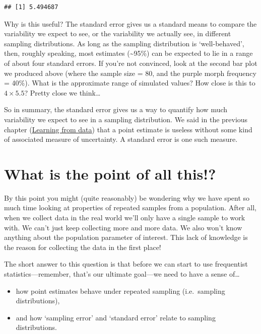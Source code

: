 \documentclass[]{book}
\begin{document}
\begin{verbatim}
## [1] 5.494687
\end{verbatim}

Why is this useful? The standard error gives us a standard means to
compare the variability we expect to see, or the variability we actually
see, in different sampling distributions. As long as the sampling
distribution is `well-behaved', then, roughly speaking, most estimates
(\textasciitilde{}95\%) can be expected to lie in a range of about four
standard errors. If you're not convinced, look at the second bar plot we
produced above (where the sample size = 80, and the purple morph
frequency = 40\%). What is the approximate range of simulated values?
How close is this to \(4 \times 5.5\)? Pretty close we think\ldots{}

So in summary, the standard error gives us a way to quantify how much
variability we expect to see in a sampling distribution. We said in the
previous chapter (\protect\hyperlink{learning-from-data}{Learning from
data}) that a point estimate is useless without some kind of associated
measure of uncertainty. A standard error is one such measure.

\section{What is the point of all
this!?}\label{what-is-the-point-of-all-this}

By this point you might (quite reasonably) be wondering why we have
spent so much time looking at properties of repeated samples from a
population. After all, when we collect data in the real world we'll only
have a single sample to work with. We can't just keep collecting more
and more data. We also won't know anything about the population
parameter of interest. This lack of knowledge is the reason for
collecting the data in the first place!

The short answer to this question is that before we can start to use
frequentist statistics---remember, that's our ultimate goal---we need to
have a sense of\ldots{}

\begin{itemize}
\item
  how point estimates behave under repeated sampling (i.e.~sampling
  distributions),
\item
  and how `sampling error' and `standard error' relate to sampling
  distributions.
\end{itemize}
\end{document}
